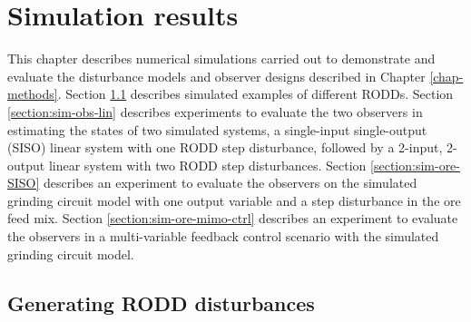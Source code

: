 \chapter{Simulation results}  \label{chap-simulation}

This chapter describes numerical simulations carried out to demonstrate and evaluate the disturbance models and observer designs described in Chapter \ref{chap-methods}. Section \ref{section:sim-RODDs} describes simulated examples of different \gls{RODD}s. Section \ref{section:sim-obs-lin} describes experiments to evaluate the two observers in estimating the states of two simulated systems, a single-input single-output (SISO) linear system with one \gls{RODD} step disturbance, followed by a 2-input, 2-output linear system with two \gls{RODD} step disturbances. Section \ref{section:sim-ore-SISO} describes an experiment to evaluate the observers on the simulated grinding circuit model with one output variable and a step disturbance in the ore feed mix. Section \ref{section:sim-ore-mimo-ctrl} describes an experiment to evaluate the observers in a multi-variable feedback control scenario with the simulated grinding circuit model.


\section{Generating RODD disturbances} \label{section:sim-RODDs}

